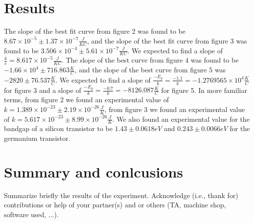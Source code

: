 \documentclass[12pt,letterpaper,twocolumn]{article}
\begin{document}
\section{Results}
The slope of the best fit curve from figure 2 was found to be $8.67 \times 10^{-5} \pm 1.37 \times 10^{-7} \frac{J}{KC}$, and the slope of the best fit curve from figure 3 was found to be $3.506 \times 10^{-4} \pm 5.61\times 10^{-7}\frac{J}{KC}$. We expected to find a slope of $\frac{k}{e} = 8.617 \times 10^{-5}\frac{J}{KC}$. The slope of the best curve from figure 4 was found to be $-1.66 \times 10^{4} \pm 716.863 \frac{K}{C}$, and the slope of the best curve from figure 5 was $-2820 \pm 76.537 \frac{K}{C}$. We expected to find a slope of $\frac{-E_g}{k} = \frac{-1.1}{k} = -1.2769565 \times 10^{4} \frac{K}{C}$ for figure 3 and a slope of $\frac{-E_g}{k} = \frac{-0.7}{k} = -8126.087 \frac{K}{C}$ for figure 5.
In more familiar terms, from figure 2 we found an experimental value of $k = 1.389 \times 10^{-23} \pm 2.19 \times 10^{-26} \frac{J}{K}$, from figure 3 we found an experimental value of $k = 5.617\times 10^{-23} \pm 8.99 \times 10^{-26}\frac{J}{K}$. We also found an experimental value for the bandgap of a silicon transistor to be $1.43 \pm 0.0618 eV$ and $0.243 \pm 0.0066 eV$ for the germanium transistor.


\section{Summary and conlcusions}

Summarize briefly the results of the experiment.
Acknowledge (i.e., thank for) contributions or help
of your partner(s) and or
others (TA, machine shop, software used, ...).

\end{document}
